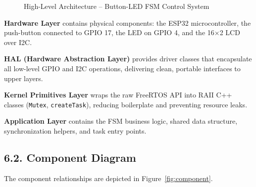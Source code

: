 \documentclass[12pt]{article}
\begin{document}
\begin{figure}[H]
    \centering
    \caption{High-Level Architecture – Button-LED FSM Control System}
    \label{fig:architecture}
\end{figure}

\textbf{Hardware Layer} contains physical components: the ESP32 microcontroller, the push-button connected to GPIO 17, the LED on GPIO 4, and the 16×2 LCD over I2C.

\textbf{HAL (Hardware Abstraction Layer)} provides driver classes that encapsulate all low-level GPIO and I2C operations, delivering clean, portable interfaces to upper layers.

\textbf{Kernel Primitives Layer} wraps the raw FreeRTOS API into RAII C++ classes (\texttt{Mutex}, \texttt{createTask}), reducing boilerplate and preventing resource leaks.

\textbf{Application Layer} contains the FSM business logic, shared data structure, synchronization helpers, and task entry points.

\subsection*{6.2. Component Diagram}

The component relationships are depicted in Figure~\ref{fig:component}.
\end{document}
